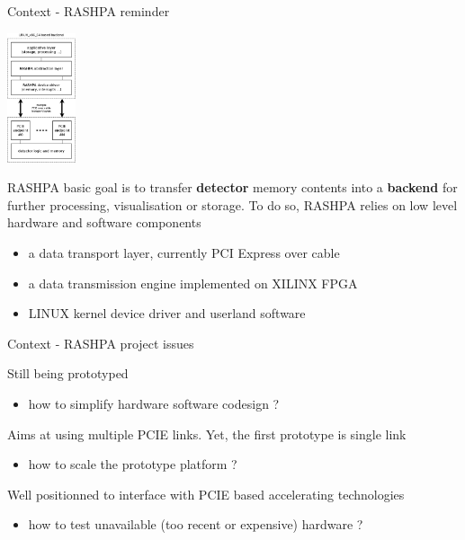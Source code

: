 \documentclass{beamer}
\begin{document}
\begin{frame}{Context - RASHPA reminder}
  \begin{center}
    \includegraphics[width=20mm]{pic/dv_reminder/main.jpeg}
  \end{center}
  \begin{tiny}
  RASHPA basic goal is to transfer \textbf{detector} memory contents into
  a \textbf{backend} for further processing, visualisation or storage. To
  do so, RASHPA relies on low level hardware and software components\\
  \begin{itemize}
  \item a data transport layer, currently PCI Express over cable
  \item a data transmission engine implemented on XILINX FPGA
  \item LINUX kernel device driver and userland software
  \end{itemize}
  \end{tiny}
\end{frame}

\begin{frame}{Context - RASHPA project issues}
  \begin{small}
  Still being prototyped
  \begin{itemize}
  \item how to simplify hardware software codesign ?
  \end{itemize}

  Aims at using multiple PCIE links. Yet, the first prototype is single link
  \begin{itemize}
  \item how to scale the prototype platform ?
  \end{itemize}

  Well positionned to interface with PCIE based accelerating technologies
  \begin{itemize}
  \item how to test unavailable (too recent or expensive) hardware ?
  \end{itemize}
  \end{small}
\end{frame}
\end{document}
